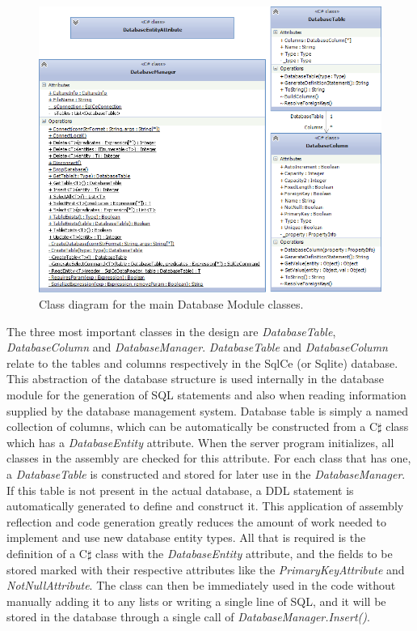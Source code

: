 \begin{figure}[h!]
    \centering
    \includegraphics[width=\textwidth]{dbmancd}
    \caption{Class diagram for the main Database Module classes.}
\end{figure}

The three most important classes in the design are \emph{DatabaseTable}, \emph{DatabaseColumn} and \emph{DatabaseManager}. \emph{DatabaseTable} and \emph{DatabaseColumn} relate to the tables and columns respectively in the SqlCe (or Sqlite) database. This abstraction of the database structure is used internally in the database module for the generation of SQL statements and also when reading information supplied by the database management system. Database table is simply a named collection of columns, which can be automatically be constructed from a C$\sharp$ class which has a \emph{DatabaseEntity} attribute. When the server program initializes, all classes in the assembly are checked for this attribute. For each class that has one, a \emph{DatabaseTable} is constructed and stored for later use in the \emph{DatabaseManager}. If this table is not present in the actual database, a DDL statement is automatically generated to define and construct it. This application of assembly reflection and code generation greatly reduces the amount of work needed to implement and use new database entity types. All that is required is the definition of a C$\sharp$ class with the \emph{DatabaseEntity} attribute, and the fields to be stored marked with their respective attributes like the \emph{PrimaryKeyAttribute} and \emph{NotNullAttribute}. The class can then be immediately used in the code without manually adding it to any lists or writing a single line of SQL, and it will be stored in the database through a single call of \emph{DatabaseManager.Insert()}.

